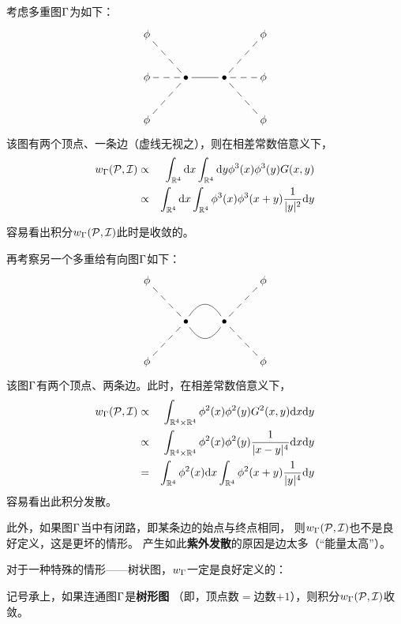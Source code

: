 \begin{example}
考虑多重图$\Gamma$为如下：
$$
  \xymatrix{
     \phi          \ar@{--}[rd]
    &&&\phi        \ar@{--}[ld]
  \\
     \phi          \ar@{--}[r]
    &\bullet       \ar@{-}[r]
    &\bullet
    &\phi          \ar@{--}[l]
  \\
    \phi           \ar@{--}[ru]
    &&&\phi        \ar@{--}[lu]
  }
$$
该图有两个顶点、一条边（虚线无视之），则在相差常数倍意义下，
\begin{eqnarray*}
     w_\Gamma(\mathcal{P},\mathcal{I})
&\propto&
     \int_{\mathbb{R}^4}\mathrm{d} x
     \int_{\mathbb{R}^4}\mathrm{d} y
       \phi^3(x)
       \phi^3(y)
       G(x,y)\\
&\propto&
     \int_{\mathbb{R}^4}\mathrm{d} x
     \int_{\mathbb{R}^4}
       \phi^3(x)
       \phi^3(x+y)
       \frac{1}{|y|^2}
       \mathrm{d} y
\end{eqnarray*}

容易看出积分$w_\Gamma(\mathcal{P},\mathcal{I})$此时是收敛的。
\label{phi^4费曼规则-example}
\end{example}

\begin{example}
再考察另一个多重给有向图$\Gamma$如下：
$$
  \xymatrix{
     \phi          \ar@{--}[rd]
    &&&\phi        \ar@{--}[ld]
  \\
    &\bullet       \ar@{-}@/^1.3pc/[r]  \ar@{-}@/_1.3pc/[r]
    &\bullet
    &
  \\
    \phi           \ar@{--}[ru]
    &&&\phi        \ar@{--}[lu]
  }
$$
该图$\Gamma$有两个顶点、两条边。此时，在相差常数倍意义下，
\begin{eqnarray*}
     w_\Gamma(\mathcal{P},\mathcal{I})
&\propto&
     \int_{\mathbb{R}^4\times\mathbb{R}^4}
       \phi^2(x)\phi^2(y)G^2(x,y)\mathrm{d} x\mathrm{d} y\\
&\propto&
     \int_{\mathbb{R}^4\times\mathbb{R}^4}
       \phi^2(x)\phi^2(y)
       \frac{1}{|x-y|^4}
       \mathrm{d} x\mathrm{d} y\\
&=&
     \int_{\mathbb{R}^4}
       \phi^2(x)
       \mathrm{d} x
     \int_{\mathbb{R}^4}
       \phi^2(x+y)
       \frac{1}{|y|^4}
       \mathrm{d} y
\end{eqnarray*}
容易看出此积分发散。
\end{example}

此外，如果图$\Gamma$当中有闭路，即某条边的始点与终点相同，
则$w_\Gamma(\mathcal{P},\mathcal{I})$也不是良好定义，这是更坏的情形。
产生如此\textbf{紫外发散}的原因是边太多（“能量太高”）。

对于一种特殊的情形——树状图，$w_\Gamma$一定是良好定义的：

\begin{prop}记号承上，如果连通图$\Gamma$是\textbf{树形图}
（即，顶点数$=$边数$+1$），则积分$w_\Gamma(\mathcal{P},\mathcal{I})$收敛。
\end{prop}

